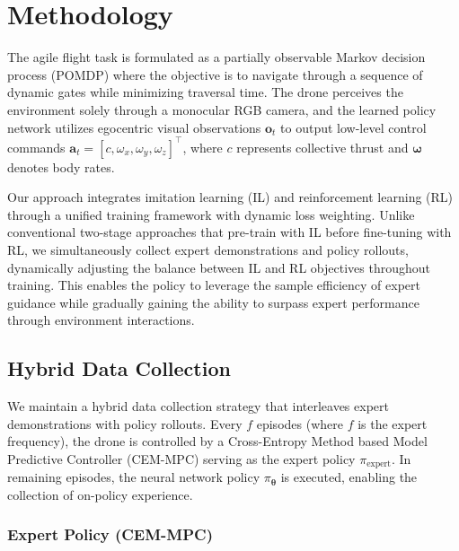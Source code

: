 \section{Methodology}
\label{sec:methodology}
The agile flight task is formulated as a partially observable Markov decision process (POMDP) where the objective is to navigate through a sequence of dynamic gates while minimizing traversal time. The drone perceives the environment solely through a monocular RGB camera, and the learned policy network utilizes egocentric visual observations $\mathbf{o}_t$ to output low-level control commands $\mathbf{a}_t = [c, \omega_x, \omega_y, \omega_z]^\top$, where $c$ represents collective thrust and $\boldsymbol{\omega}$ denotes body rates.

Our approach integrates imitation learning (IL) and reinforcement learning (RL) through a unified training framework with dynamic loss weighting. Unlike conventional two-stage approaches that pre-train with IL before fine-tuning with RL, we simultaneously collect expert demonstrations and policy rollouts, dynamically adjusting the balance between IL and RL objectives throughout training. This enables the policy to leverage the sample efficiency of expert guidance while gradually gaining the ability to surpass expert performance through environment interactions.

\subsection{Hybrid Data Collection}
\label{sec:data_collection}

We maintain a hybrid data collection strategy that interleaves expert demonstrations with policy rollouts. Every $f$ episodes (where $f$ is the expert frequency), the drone is controlled by a Cross-Entropy Method based Model Predictive Controller (CEM-MPC) serving as the expert policy $\pi_{\text{expert}}$. In remaining episodes, the neural network policy $\pi_{\boldsymbol{\theta}}$ is executed, enabling the collection of on-policy experience.

\subsubsection{Expert Policy (CEM-MPC)}

